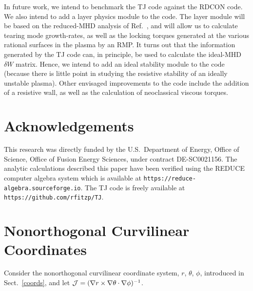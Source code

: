 \documentclass[12pt,prb,aps]{revtex4-1}
\begin{document}
In future work, we intend to benchmark the TJ code against the RDCON code. We also intend to add a layer physics module to the code. The
layer module will be based on
the reduced-MHD analysis of Ref.~, and will allow us to calculate tearing mode growth-rates, as well as the locking torques generated at the various rational
surfaces in the plasma by an RMP. It turns out that the information generated by the TJ code can, in principle,  be used to calculate the ideal-MHD $\delta W$
matrix.\cite{gs1} Hence, we intend to add an ideal stability module to the code (because there is little point in studying the resistive stability of
an ideally unstable plasma). Other envisaged improvements to the code include the addition of a resistive wall, as well as the
calculation of neoclassical viscous torques. 
\fi

\section*{Acknowledgements}
This research was directly funded by the U.S.\ Department of Energy, Office of Science, Office of Fusion Energy Sciences, under  contract DE-SC0021156. 
The analytic calculations  described  this paper have been verified using the {\sc REDUCE} computer algebra system which is available at {\tt https://reduce-algebra.sourceforge.io}. The TJ code is freely 
available at {\tt https://github.com/rfitzp/TJ}.


\appendix
\section{Nonorthogonal Curvilinear Coordinates}\label{s2}
Consider the nonorthogonal curvilinear coordinate system, $r$, $\theta$, $\phi$,  introduced in Sect.~\ref{coords}, and let
${\cal J}=  (\nabla r\times \nabla\theta\cdot\nabla\phi)^{-1}$.
\end{document}
